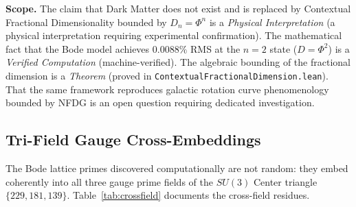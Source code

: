 \textbf{Scope.} The claim that Dark Matter does not exist and is replaced by Contextual Fractional Dimensionality bounded by $D_n = \Phi^n$ is a \emph{Physical Interpretation} (a physical interpretation requiring experimental confirmation). The mathematical fact that the Bode model achieves $0.0088\%$ RMS at the $n=2$ state ($D = \Phi^2$) is a \emph{Verified Computation} (machine-verified). The algebraic bounding of the fractional dimension is a \emph{Theorem} (proved in \texttt{ContextualFractionalDimension.lean}). That the same framework reproduces galactic rotation curve phenomenology bounded by NFDG is an open question requiring dedicated investigation.

\subsection{Tri-Field Gauge Cross-Embeddings}
The Bode lattice primes discovered computationally are not random: they embed coherently into all three gauge prime fields of the $SU(3)$ Center triangle $\{229, 181, 139\}$. Table~\ref{tab:crossfield} documents the cross-field residues.

\begin{table}[ht]
\centering
\renewcommand{\arraystretch}{1.3}
\caption{Cross-field embeddings of the optimal Bode lattice primes into the SU(3) Center triangle. Every Bode prime lands on a structurally significant position (primitive root or golden orbit) in at least two of the three gauge fields. The residue $499 \equiv 137 \pmod{181}$ is particularly striking: the inverse fine structure constant $\alpha^{-1} \approx 137$ emerges naturally on the $\bar\varphi$-orbit of the weak-force field.}
\label{tab:crossfield}
\end{table}

